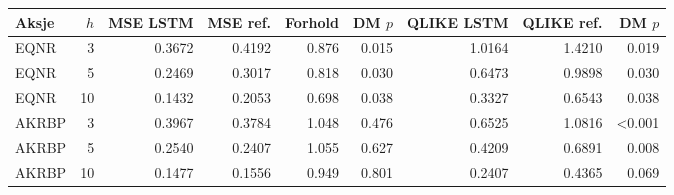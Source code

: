 \begin{tabular}{lrrrrrrrr}
\toprule
Aksje & $h$ & MSE LSTM & MSE ref. & Forhold & DM $p$ & QLIKE LSTM & QLIKE ref. & DM $p$ \\
\midrule
EQNR & 3 & 0.3672 & 0.4192 & 0.876 & 0.015 & 1.0164 & 1.4210 & 0.019 \\
EQNR & 5 & 0.2469 & 0.3017 & 0.818 & 0.030 & 0.6473 & 0.9898 & 0.030 \\
EQNR & 10 & 0.1432 & 0.2053 & 0.698 & 0.038 & 0.3327 & 0.6543 & 0.038 \\
AKRBP & 3 & 0.3967 & 0.3784 & 1.048 & 0.476 & 0.6525 & 1.0816 & <0.001 \\
AKRBP & 5 & 0.2540 & 0.2407 & 1.055 & 0.627 & 0.4209 & 0.6891 & 0.008 \\
AKRBP & 10 & 0.1477 & 0.1556 & 0.949 & 0.801 & 0.2407 & 0.4365 & 0.069 \\
\bottomrule
\end{tabular}
